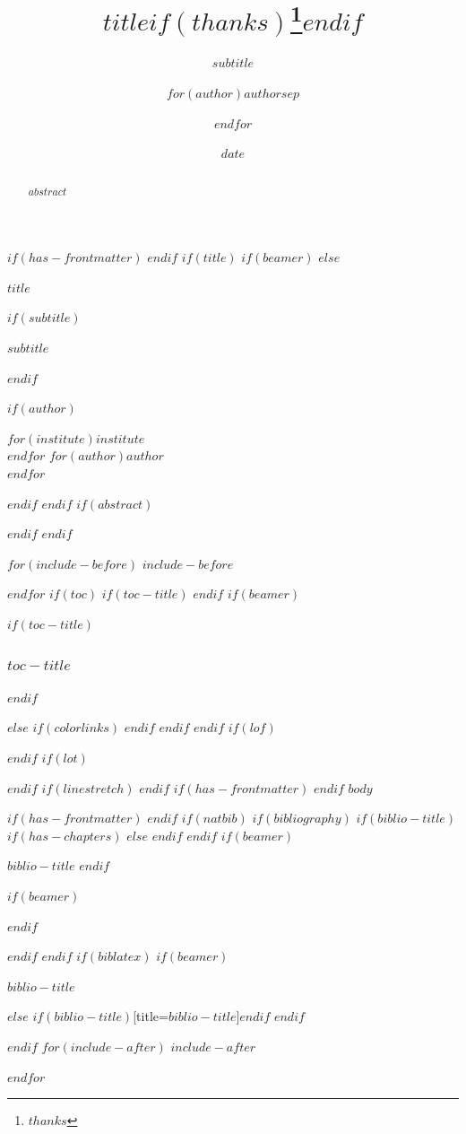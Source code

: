 \documentclass[lualatex,paper=a4,fontsize=12pt,jafontsize=12pt,line_length=30zw,number_of_lines=30,baselineskip=23.34pt]{jlreq}
\title{$title$$if(thanks)$\thanks{$thanks$}$endif$}
\subtitle{$subtitle$}
\author{$for(author)$$author$$sep$ \and $endfor$}
\date{$date$}
\institute{$for(institute)$$institute$$sep$ \and $endfor$}
\newif\ifbibliography
\begin{document}
$if(has-frontmatter)$
\frontmatter
$endif$
$if(title)$
$if(beamer)$
\frame{\titlepage}
$else$
\begin{center}
{\fontsize{14pt}{14pt}\selectfont\bfseries $title$\par}
$if(subtitle)$
{\normalsize $subtitle$\par}
$endif$
\end{center}
$if(author)$
\begin{flushright}
$for(institute)$$institute$\\
$endfor$
$for(author)$$author$\\
$endfor$
\end{flushright}
\vspace{\baselineskip}
$endif$
$endif$
$if(abstract)$
\begin{abstract}
$abstract$
\end{abstract}
$endif$
$endif$

$for(include-before)$
$include-before$

$endfor$
$if(toc)$
$if(toc-title)$
\renewcommand*\contentsname{$toc-title$}
$endif$
$if(beamer)$
\begin{frame}[allowframebreaks]
$if(toc-title)$
  \frametitle{$toc-title$}
$endif$
  \tableofcontents[hideallsubsections]
\end{frame}
$else$
{
$if(colorlinks)$
\hypersetup{linkcolor=$if(toccolor)$$toccolor$$else$$endif$}
$endif$
\setcounter{tocdepth}{$toc-depth$}
\tableofcontents
}
$endif$
$endif$
$if(lof)$
\listoffigures
$endif$
$if(lot)$
\listoftables
$endif$
$if(linestretch)$
$endif$
$if(has-frontmatter)$
\mainmatter
$endif$
$body$

$if(has-frontmatter)$
\backmatter
$endif$
$if(natbib)$
$if(bibliography)$
$if(biblio-title)$
$if(has-chapters)$
\renewcommand\bibname{$biblio-title$}
$else$
\renewcommand\refname{$biblio-title$}
$endif$
$endif$
$if(beamer)$
\begin{frame}[allowframebreaks]{$biblio-title$}
  \bibliographytrue
$endif$
  
$if(beamer)$
\end{frame}
$endif$

$endif$
$endif$
$if(biblatex)$
$if(beamer)$
\begin{frame}[allowframebreaks]{$biblio-title$}
  \bibliographytrue
  \printbibliography[heading=none]
\end{frame}
$else$
\printbibliography$if(biblio-title)$[title=$biblio-title$]$endif$
$endif$

$endif$
$for(include-after)$
$include-after$

$endfor$
\end{document}
